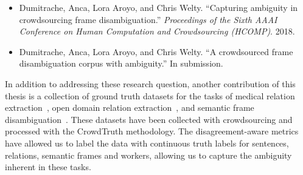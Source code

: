 \begin{itemize}
    \begin{itemize}
        \item Dumitrache, Anca, Lora Aroyo, and Chris Welty. ``Capturing ambiguity in crowdsourcing frame disambiguation.'' \textit{Proceedings of the Sixth AAAI Conference on Human Computation and Crowdsourcing (HCOMP)}. 2018.~\cite{DBLP:conf/hcomp/DumitracheAW18}
        \item Dumitrache, Anca, Lora Aroyo, and Chris Welty. ``A crowdsourced frame disambiguation corpus with ambiguity.'' In submission.
    \end{itemize}
\end{itemize}

In addition to addressing these research question, another contribution of this thesis is a collection of ground truth datasets for the tasks of medical relation extraction~\cite{anca_dumitrache_2016_50676}, open domain relation extraction~\cite{crowdODrelexdata2016}, and semantic frame disambiguation~\cite{anca_dumitrache_2018_1472345}. These datasets have been collected with crowdsourcing and processed with the CrowdTruth methodology. The disagreement-aware metrics have allowed us to label the data with continuous truth labels for sentences, relations, semantic frames and workers, allowing us to capture the ambiguity inherent in these tasks.






    
